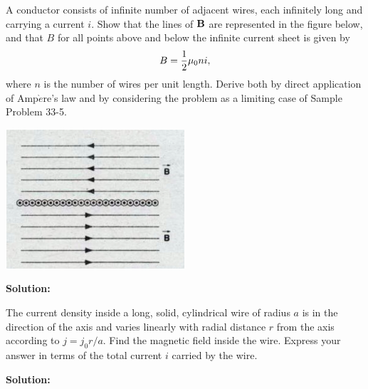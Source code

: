 \documentclass[11pt]{article}
\begin{document}
\vspace*{0.25in}


\begin{problem}[(P33.12)]
A conductor consists of infinite number of adjacent wires, each infinitely long and carrying a current $i$. Show that the lines of $\mathbf{B}$ are represented in the figure below, and that $B$ for all points above and below the infinite current sheet is given by
\[
	B = \frac{1}{2} \mu_0ni,
\]
where $n$ is the number of wires per unit length. Derive both by direct application of Amp$\grave{e}$re's law
and by considering the problem as a limiting case of Sample Problem 33-5.
\begin{center}
\includegraphics[scale=0.6]{prob1.png}
\end{center}
\end{problem}


\textbf{Solution:}\\

\clearpage

\begin{problem}[(P33.13)*]
The current density inside a long, solid, cylindrical wire of radius $a$ is in the direction of the axis
and varies linearly with radial distance $r$ from the axis according to $j = j_0r/a$. Find the magnetic
field inside the wire. Express your answer in terms of the total current $i$ carried by the wire.
\end{problem}


\textbf{Solution:}\\

\clearpage
\end{document}
